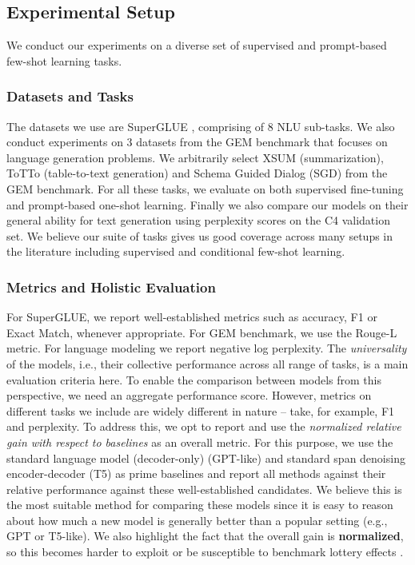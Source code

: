 \documentclass[10pt]{article}
\begin{document}
\subsection{Experimental Setup}
We conduct our experiments on a diverse set of supervised and prompt-based few-shot learning tasks. 

\subsubsection{Datasets and Tasks}
The datasets we use are SuperGLUE \citep{wang2019superglue}, comprising of 8 NLU sub-tasks. We also conduct experiments on 3 datasets from the GEM benchmark \citep{gehrmann2021gem} that focuses on language generation problems. We arbitrarily select XSUM (summarization), ToTTo (table-to-text generation) \citep{parikh2020totto} and Schema Guided Dialog (SGD) \citep{rastogi2019towards} from the GEM benchmark. For all these tasks, we evaluate on both supervised fine-tuning and prompt-based one-shot learning. Finally we also compare our models on their general ability for text generation using perplexity scores on the C4 validation set. We believe our suite of tasks gives us good coverage across many setups in the literature including supervised and conditional few-shot learning.

\subsubsection{Metrics and Holistic Evaluation} For SuperGLUE, we report well-established metrics such as accuracy, F1 or Exact Match, whenever appropriate. For GEM benchmark, we use the Rouge-L metric. For language modeling we report negative log perplexity.
The \emph{universality} of the models, i.e., their collective performance across all range of tasks, is a main evaluation criteria here. To enable the comparison between models from this perspective, we need an aggregate performance score. However, metrics on different tasks we include are widely different in nature -- take, for example, F1 and perplexity. To address this, we opt to report and use the \textit{normalized relative gain with respect to baselines} as an overall metric. For this purpose, we use the standard language model (decoder-only) (GPT-like) and standard span denoising encoder-decoder (T5) as prime baselines and report all methods against their relative performance against these well-established candidates. We believe this is the most suitable method for comparing these models since it is easy to reason about how much a new model is generally better than a popular setting (e.g., GPT or T5-like). We also highlight the fact that the overall gain is \textbf{normalized}, so this becomes harder to exploit or be susceptible to benchmark lottery effects \citep{dehghani2021benchmark}. 
\end{document}

